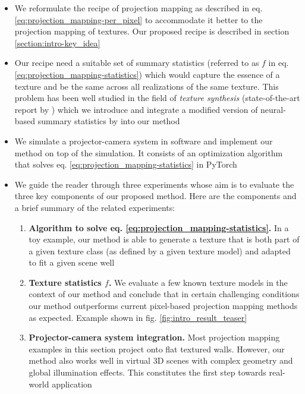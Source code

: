 \begin{itemize}
    \item We reformulate the recipe of projection mapping as described in eq. \ref{eq:projection_mapping-per_pixel} to accommodate it better to the projection mapping of textures. Our proposed recipe is described in section \ref{section:intro-key_idea}
    \item Our recipe need a suitable set of summary statistics (referred to as \(f\) in eq. \ref{eq:projection_mapping-statistics}) which would capture the essence of a texture and be the same across all realizations of the same texture. This problem has been well studied in the field of \textit{texture synthesis} (state-of-the-art report by \citet{Raad2018}) which we introduce and integrate a modified version of neural-based summary statistics by \citet{Gatys2015} into our method
    \item We simulate a projector-camera system in software and implement our method on top of the simulation. It consists of an optimization algorithm that solves eq. \ref{eq:projection_mapping-statistics} in PyTorch
    \item We guide the reader through three experiments whose aim is to evaluate the three key components of our proposed method. Here are the components and a brief summary of the related experiments:
    \begin{enumerate}
        \item \textbf{Algorithm to solve eq. \ref{eq:projection_mapping-statistics}.} In a toy example, our method is able to generate a texture that is both part of a given texture class (as defined by a given texture model) and adapted to fit a given scene well
        \item \textbf{Texture statistics \(f\).} We evaluate a few known texture models in the context of our method and conclude that in certain challenging conditions our method outperforms current pixel-based projection mapping methods as expected. Example shown in fig. \ref{fig:intro_result_teaser}
        \item \textbf{Projector-camera system integration.} Most projection mapping examples in this section project onto flat textured walls. However, our method also works well in virtual 3D scenes with complex geometry and global illumination effects. This constitutes the first step towards real-world application
    \end{enumerate}
\end{itemize}

